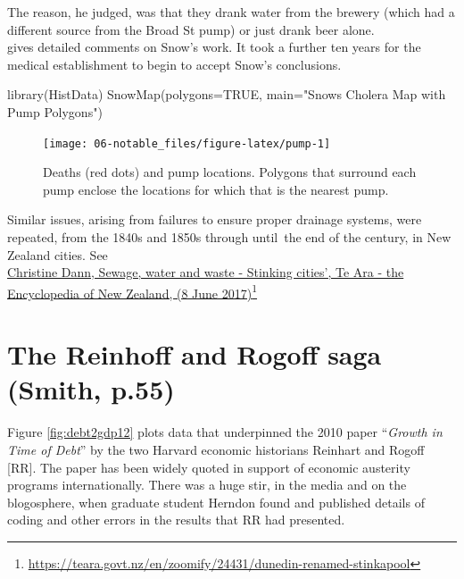 \documentclass[
  10pt,
  b5paper]{book}
\newenvironment{Shaded}{\begin{snugshade}}{\end{snugshade}}
\newcommand{\AttributeTok}[1]{\textcolor[rgb]{0.77,0.63,0.00}{#1}}
\newcommand{\ConstantTok}[1]{\textcolor[rgb]{0.00,0.00,0.00}{#1}}
\newcommand{\FunctionTok}[1]{\textcolor[rgb]{0.00,0.00,0.00}{#1}}
\newcommand{\NormalTok}[1]{#1}
\newcommand{\StringTok}[1]{\textcolor[rgb]{0.31,0.60,0.02}{#1}}
\begin{document}
The reason, he judged, was that they drank water from the brewery (which had a
different source from the Broad St pump) or just drank beer alone.\\
\citet{coleman2019causality} gives detailed comments on Snow's work.
It took a further ten years for the medical establishment to begin to accept
Snow's conclusions.

\begin{Shaded}
\begin{Highlighting}[]
\FunctionTok{library}\NormalTok{(HistData)}
\FunctionTok{SnowMap}\NormalTok{(}\AttributeTok{polygons=}\ConstantTok{TRUE}\NormalTok{, }\AttributeTok{main=}\StringTok{"Snow\textquotesingle{}s Cholera Map with Pump Polygons"}\NormalTok{)}
\end{Highlighting}
\end{Shaded}

\begin{figure}[H]
\texttt{[image: 06-notable\_files/figure-latex/pump-1]} \caption{Deaths (red dots) and pump locations.  Polygons that surround
each pump enclose the locations for which that is the nearest pump.}\label{fig:pump}
\end{figure}

Similar issues, arising from failures to ensure proper drainage systems,
were repeated, from the 1840s and 1850s through until~the end of the century,
in New Zealand cities. See\\
\href{https://teara.govt.nz/en/zoomify/24431/dunedin-renamed-stinkapool}{Christine Dann, Sewage, water and waste - Stinking cities', Te Ara - the Encyclopedia of New Zealand, (8 June 2017)}\footnote{\url{https://teara.govt.nz/en/zoomify/24431/dunedin-renamed-stinkapool}}

\hypertarget{the-reinhoff-and-rogoff-saga-smith-p.55}{%
\section{The Reinhoff and Rogoff saga (Smith, p.55)}\label{the-reinhoff-and-rogoff-saga-smith-p.55}}

Figure \ref{fig:debt2gdp12} plots data that underpinned
the 2010 paper ``\emph{Growth in Time of Debt}'' by the two Harvard economic
historians Reinhart and Rogoff {[}RR{]}. The paper \citep{reinhart2010growth}
has been widely quoted in support of economic austerity programs
internationally. There was a huge stir, in the media and on the
blogosphere, when graduate student Herndon found and published
details of coding and other errors in the results that RR had
presented.
\end{document}
